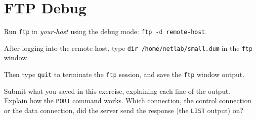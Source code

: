 \documentclass{../UTNetLab}
\begin{document}
\section{FTP Debug}
    Run \lstinline{ftp} in \textit{your-host} using the debug mode: \lstinline[emph={your-host, remote-host}]{ftp -d remote-host}.

    After logging into the remote host, type \lstinline{dir /home/netlab/small.dum} in the \lstinline{ftp} window.

    Then type \lstinline{quit} to terminate the \lstinline{ftp} session, and save the \lstinline{ftp} window output.
    
    \begin{report}
    \item Submit what you saved in this exercise, explaining each line of the output.
    Explain how the \lstinline{PORT} command works.
    Which connection, the control connection or the data connection, did the server send the response (the \lstinline{LIST} output) on?
    \end{report}
\end{document}
